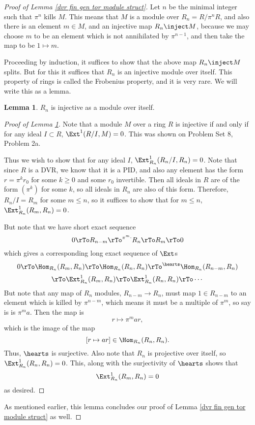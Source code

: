 \documentclass[12 pt]{article}
\theoremstyle{definition}
\newtheorem{lemma}[thm]{Lemma}
\renewcommand{\(}{\left(}
\renewcommand{\)}{\right)}
\begin{document}
\begin{proof}[Proof of Lemma \ref{dvr fin gen tor module struct}] Let $n$ be the minimal integer such that $\pi^n$ kills $M$. This means that $M$ is a module over $R_n=R/\pi^nR$, and also there is an element $m \in M$, and an injective map $R_n \inject M$, because we may choose $m$ to be an element which is not annihilated by $\pi^{n-1}$, and then take the map to be $1 \mapsto m$.

Proceeding by induction, it suffices to show that the above map $R_n \inject M$ splits. But for this it suffices that $R_n$ is an injective module over itself. This property of rings is called the Frobenius property, and it is very rare. We will write this as a lemma.
\begin{lemma} $R_n$ is injective as a module over itself.
\label{Rn Frobenius}
\end{lemma}
\begin{proof}[Proof of Lemma \ref{Rn Frobenius}] Note that a module $M$ over a ring $R$ is injective if and only if for any ideal $I \subset R$, $\Ext^1(R/I,M)=0$. This was shown on  Problem Set 8, Problem 2a.

Thus we wish to show that for any ideal $I$, $\Ext^1_{R_n}(R_n/I,R_n)=0$. Note that since $R$ is a DVR, we know that it is a PID, and also any element has the form $r=\pi^kr_0$ for some $k \geq 0$ and some $r_0$ invertible. Then all ideals in $R$ are of the form $(\pi^k)$ for some $k$, so all ideals in $R_n$ are also of this form. Therefore, $R_n/I=R_m$ for some $m \leq n$, so it suffices to show that for $m \leq n$, $\Ext^1_{R_n}(R_m,R_n)=0$.

But note that we have short exact sequence
\[ 0 \rTo R_{n-m} \rTo^{\pi^m \cdot} R_n \rTo R_m \rTo 0\]
which gives a corresponding long exact sequence of $\Ext$s
\[0 \rTo \Hom_{R_n}(R_m,R_n) \rTo \Hom_{R_n}(R_n,R_n) \rTo^\hearts \Hom_{R_n}(R_{n-m},R_n)\]
\[\rTo \Ext^1_{R_n}(R_m,R_n) \rTo \Ext^1_{R_n}(R_n,R_n) \rTo \cdots\]
But note that any map of $R_n$ modules, $R_{n-m} \to R_n$, must map $1 \in R_{n-m}$ to an element which is killed by $\pi^{n-m}$, which means it must be a multiple of $\pi^m$, so say is is $\pi^ma$. Then the map is
\[r \mapsto \pi^mar,\]
which is the image of the map
\[[r \mapsto ar] \in \Hom_{R_n}(R_n,R_n).\]
Thus, $\hearts$ is surjective.
Also note that $R_n$ is projective over itself, so $\Ext^1_{R_n}(R_n,R_n)=0$. This, along with the surjectivity of $\hearts$ shows that
\[\Ext^1_{R_n}(R_m,R_n)=0\]
as desired.
\end{proof}
As mentioned earlier, this lemma concludes our proof of Lemma \ref{dvr fin gen tor module struct} as well.
\end{proof}
\end{document}
